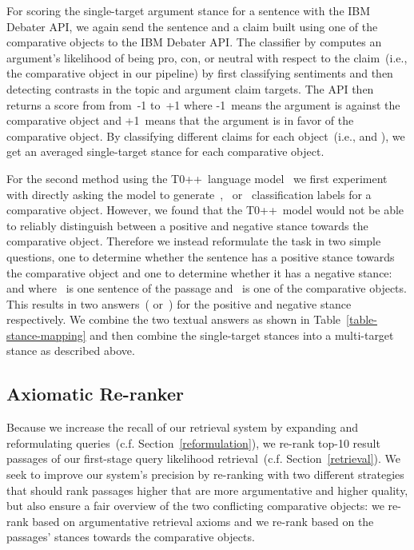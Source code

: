 For scoring the single-target argument stance for a sentence with the IBM Debater API, we again send the sentence and a claim built using one of the comparative objects to the IBM Debater API.
The classifier by \citet{BarHaimBDSS2017} computes an argument's likelihood of being pro, con, or neutral with respect to the claim~(i.e., the comparative object in our pipeline) by first classifying sentiments and then detecting contrasts in the topic and argument claim targets.
The API then returns a score from from~-1 to~+1 where -1~means the argument is against the comparative object and +1~means that the argument is in favor of the comparative object.
By classifying different claims for each object~(i.e.,  and ), we get an averaged single-target stance for each comparative object.

For the second method using the T0++~language model~\cite{SanhWRBSACSLRDBXTSSKCNDCJWMSYPBWNRSSFFTBGBWR2021} we first experiment with directly asking the model to generate~, ~or~ classification labels for a comparative object.
However, we found that the T0++~model would not be able to reliably distinguish between a positive and negative stance towards the comparative object.
Therefore we instead reformulate the task in two simple questions, one to determine whether the sentence has a positive stance towards the comparative object and one to determine whether it has a negative stance:  and  where ~is one sentence of the passage and ~is one of the comparative objects.
This results in two answers~( or~) for the positive and negative stance respectively. We combine the two textual answers as shown in Table~\ref{table-stance-mapping} and then combine the single-target stances into a multi-target stance as described above.

\subsection{Axiomatic Re-ranker}
\label{reranking}


Because we increase the recall of our retrieval system by expanding and reformulating queries~(c.f. Section~\ref{reformulation}), we re-rank top-10 result passages of our first-stage query likelihood retrieval~(c.f. Section~\ref{retrieval}).
We seek to improve our system's precision by re-ranking with two different strategies that should rank passages higher that are more argumentative and higher quality, but also ensure a fair overview of the two conflicting comparative objects: \Ni we re-rank based on argumentative retrieval axioms and \Nii we re-rank based on the passages' stances towards the comparative objects.

